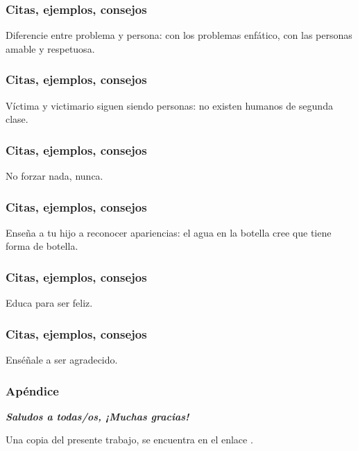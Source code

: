 \documentclass[12pt,spanish,x11names]{beamer}
\def\talktitle{¿Todo es bullying?}
\def\talkpubpdf{https://www.dropbox.com/s/tuhjx03333fl5vu/todo-es-bullying.pdf?dl=0}
\newcommand{\framedhref}[2]{\href{#1}{\fcolorbox{bluu}{bluu}{\textcolor{white}{#2}}}}
\begin{document}
\begin{frame}
  \frametitle{Citas, ejemplos, consejos}
  \begin{block}{}
    Diferencie entre problema y persona: con los problemas enfático, con las personas amable y respetuosa.
  \end{block}
\end{frame}
\begin{frame}
  \frametitle{Citas, ejemplos, consejos}
  \begin{block}{}
    Víctima y victimario siguen siendo personas: no existen humanos de segunda clase.
  \end{block}
\end{frame}
\begin{frame}
  \frametitle{Citas, ejemplos, consejos}
  \begin{block}{}
    No forzar nada, nunca.
  \end{block}
\end{frame}
\begin{frame}
  \frametitle{Citas, ejemplos, consejos}
  \begin{block}{}
    Enseña a tu hijo a reconocer apariencias: el agua en la botella cree que tiene forma de botella.
  \end{block}
\end{frame}
\begin{frame}
  \frametitle{Citas, ejemplos, consejos}
  \begin{block}{}
    Educa para ser feliz.
  \end{block}
\end{frame}
\begin{frame}
  \frametitle{Citas, ejemplos, consejos}
  \begin{block}{}
    Enséñale a ser agradecido.
  \end{block}
\end{frame}
\begin{frame}[c]\frametitle{Apéndice}
\centering\decofourleft\quad\decofourright

\textbf{\emph {Saludos a todas/os, ¡Muchas gracias!}}

Una copia del presente trabajo, se encuentra en el enlace \framedhref{\talkpubpdf}{\talktitle}.

\end{frame}
\end{document}
